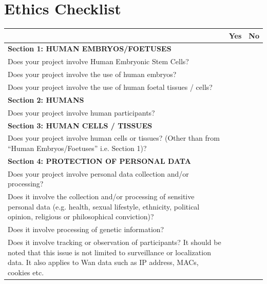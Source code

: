 \documentclass[12pt,twoside]{report}
\begin{document}
\chapter{Ethics Checklist}
{
\renewcommand*{\arraystretch}{1.3}
\begin{longtable}{ |p{13.2cm}|p{0.6cm}|p{0.6cm}| }
\hline
 & \bf Yes & \bf No \\
\hline

\multicolumn{3}{|l|}{\cellcolor{green!25}\bf Section 1: HUMAN EMBRYOS/FOETUSES} \\
\hline

Does your project involve Human Embryonic Stem Cells? & & \\
\hline

Does your project involve the use of human embryos? & & \\
\hline

Does your project involve the use of human foetal tissues / cells? & & \\
\hline

\multicolumn{3}{|l|}{\cellcolor{green!25}\bf Section 2: HUMANS} \\
\hline

Does your project involve human participants? & & \\
\hline

\multicolumn{3}{|l|}{\cellcolor{green!25}\bf Section 3: HUMAN CELLS / TISSUES} \\
\hline

Does your project involve human cells or tissues? (Other than from “Human Embryos/Foetuses” i.e. Section 1)? & & \\
\hline

\multicolumn{3}{|l|}{\cellcolor{green!25}\bf Section 4: PROTECTION OF PERSONAL DATA} \\
\hline

Does your project involve personal data collection and/or processing? & & \\
\hline

Does it involve the collection and/or processing of sensitive personal data (e.g. health, sexual lifestyle, ethnicity, political opinion, religious or philosophical conviction)? & & \\
\hline

Does it involve processing of genetic information? & & \\
\hline

Does it involve tracking or observation of participants? It should be noted that this issue is not limited to surveillance or localization data. It also applies to Wan data such as IP address, MACs, cookies etc. & & \\
\hline


\end{longtable}}
\end{document}
